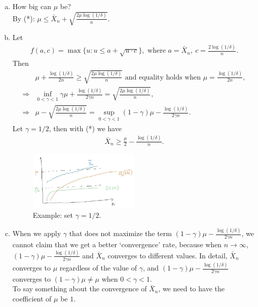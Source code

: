 \documentclass[twoside]{article}
\begin{document}
\begin{remark} \mbox{}
    \begin{enumerate}[(a)]
        \item How big can $\mu$ be? 
            \\ By (*): $\mu \le \bar{X}_n + \sqrt{\frac{2\mu\log(1/\delta)}{n}}.$
        \item Let
            \begin{align*}
                f(a,c)=\max\{ u: u\le a + \sqrt{u\cdot c} \}, \text{ where } a= \bar{X}_n,\ c=\frac{2 \log(1/\delta)}{n}.
            \end{align*}
            Then
            \begin{align*}
                & \mu + \frac{ \log(1/\delta) }{ 2 n } \ge \sqrt{ \frac{ 2 \mu \log(1/\delta) }{n} } \text{ and equality holds when } \mu = \frac{ \log(1/\delta) }{ 2 n },\\
                \Rightarrow & \inf_{0<\gamma <1} \gamma \mu +   \frac{ \log(1/\delta) }{ 2 \gamma n } =  \sqrt{ \frac{ 2 \mu \log(1/\delta) }{n} },  \\
                \Rightarrow 
                & \mu - \sqrt{\frac{2\mu\log(1/\delta)}{n}} = \sup_{0< \gamma<1} (1-\gamma) \mu - \frac{\log(1/\delta)}{2\gamma n} .
            \end{align*}
            Let $\gamma =1/2$, then with (*) we have
            \begin{align*}
                \bar{X}_n \ge \frac{ \mu }{2} - \frac{\log(1/\delta)}{ n }.
            \end{align*}
            \vspace*{-1em}
            \begin{figure}[H]
                \centering
                \includegraphics[width=0.5\textwidth]{draw - lec04.jpg}
                \caption{Example: set $\gamma=1/2$.}
                \label{fig:enter-label}
            \end{figure}
        \item When we apply $\gamma$ that does not maximize the term $(1-\gamma) \mu - \frac{\log(1/\delta)}{2\gamma n}$, we cannot claim that we get a better `convergence' rate, because when $n\rightarrow \infty$, $ (1-\gamma) \mu - \frac{\log(1/\delta)}{2\gamma n}$ and $\bar{X}_n$ converges to different values. In detail, $\bar{X}_n$ converges to $\mu$ regardless of the value of $\gamma$, and $(1-\gamma) \mu - \frac{\log(1/\delta)}{2\gamma n}$ converges to $(1-\gamma)\mu\ne \mu$ when $0<\gamma<1$.
        \\
        To say something about the convergence of $\bar{X}_n$, we need to have the coefficient of $\mu$ be $1$.
    \end{enumerate}
    
\end{remark}
\end{document}
